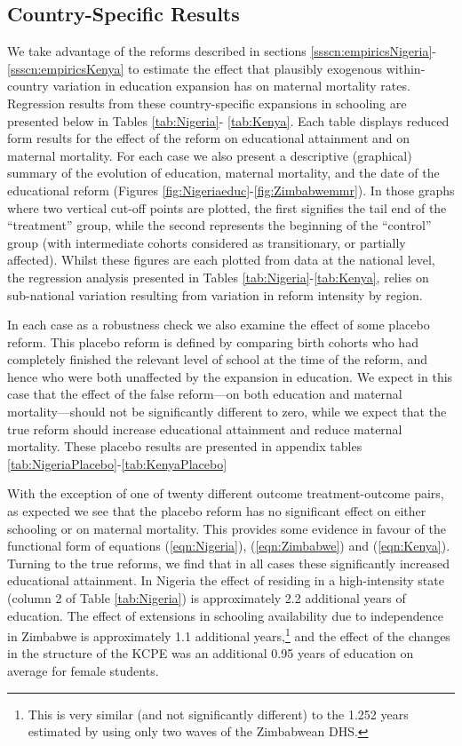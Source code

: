 \documentclass{article}[12pt,subeqn]
\begin{document}
\begin{spacing}{1.4}
\subsection{Country-Specific Results}
We take advantage of the reforms described in sections \ref{ssscn:empiricsNigeria}-\ref{ssscn:empiricsKenya} to estimate 
the effect that plausibly exogenous within-country variation in education expansion has on maternal mortality rates.
Regression results from these country-specific expansions in schooling are presented below in Tables \ref{tab:Nigeria}-%
\ref{tab:Kenya}.  Each table displays reduced form results for the effect of the reform on educational attainment and on 
maternal mortality.  For each case we also present a descriptive (graphical) summary of the evolution of education, 
maternal mortality, and the date of the educational reform (Figures \ref{fig:Nigeriaeduc}-\ref{fig:Zimbabwemmr}). In 
those graphs where two vertical cut-off points are plotted, the first signifies the tail end of the ``treatment'' group, 
while the second represents the beginning of the ``control'' group (with intermediate cohorts considered as transitionary,
or partially affected). Whilst these figures are each plotted from data at the national level, the regression analysis 
presented in Tables \ref{tab:Nigeria}-\ref{tab:Kenya}, relies on sub-national variation resulting from variation in reform 
intensity by region. 

In each case as a robustness check we also examine the effect of some placebo reform.  This placebo reform is defined
by comparing birth cohorts who had completely finished the relevant level of school at the time of the reform, and hence
who were both unaffected by the expansion in education.  We expect in this case that the effect of the false reform---on 
both education and maternal mortality---should not be significantly different to zero, while we expect that the true reform 
should increase educational attainment and reduce maternal mortality.  These placebo results are presented in appendix tables 
\ref{tab:NigeriaPlacebo}-\ref{tab:KenyaPlacebo}

With the exception of one of twenty different outcome treatment-outcome pairs, as expected we see that the placebo 
reform has no significant effect on either schooling or on maternal mortality.  This provides some evidence in favour
of the functional form of equations (\ref{eqn:Nigeria}), (\ref{eqn:Zimbabwe}) and (\ref{eqn:Kenya}).  Turning to the
true reforms, we find that in all cases these significantly increased educational attainment. In Nigeria the effect of
residing in a high-intensity state (column 2 of Table \ref{tab:Nigeria}) is approximately 2.2 additional years of education.
The effect of extensions in schooling availability due to independence in Zimbabwe is approximately 1.1 additional 
years,\footnote{This is very similar (and not significantly different) to the 1.252 years estimated by 
\citet{AgueroBharawadj2011} using only two waves of the Zimbabwean DHS.} and the effect of the changes in the structure
of the KCPE was an additional 0.95 years of education on average for female students.


\end{spacing}
\end{document}
